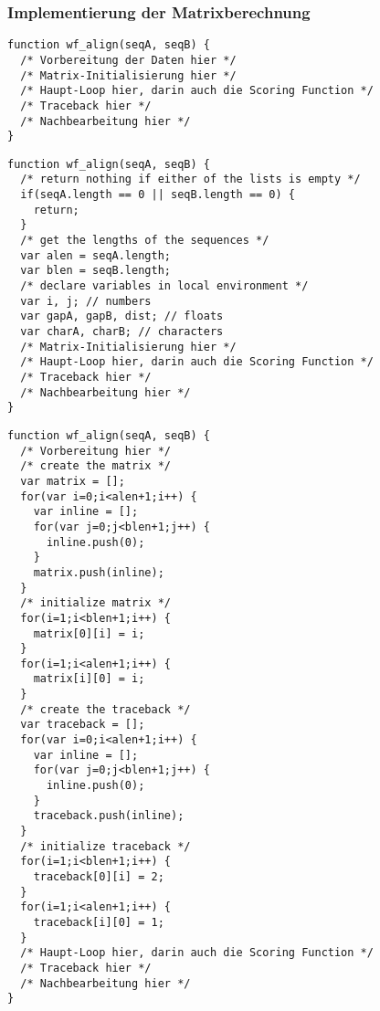 \subsubsection{\texorpdfstring{{Implementierung der
Matrixberechnung}}{Implementierung der Matrixberechnung}}

\begin{verbatim}
function wf_align(seqA, seqB) {
  /* Vorbereitung der Daten hier */
  /* Matrix-Initialisierung hier */
  /* Haupt-Loop hier, darin auch die Scoring Function */
  /* Traceback hier */
  /* Nachbearbeitung hier */
}
\end{verbatim}



\begin{verbatim}
function wf_align(seqA, seqB) {
  /* return nothing if either of the lists is empty */
  if(seqA.length == 0 || seqB.length == 0) {
    return;
  }
  /* get the lengths of the sequences */
  var alen = seqA.length;
  var blen = seqB.length;
  /* declare variables in local environment */
  var i, j; // numbers
  var gapA, gapB, dist; // floats
  var charA, charB; // characters
  /* Matrix-Initialisierung hier */
  /* Haupt-Loop hier, darin auch die Scoring Function */
  /* Traceback hier */
  /* Nachbearbeitung hier */
}
\end{verbatim}


\begin{verbatim}
function wf_align(seqA, seqB) {
  /* Vorbereitung hier */
  /* create the matrix */
  var matrix = [];
  for(var i=0;i<alen+1;i++) {
    var inline = [];
    for(var j=0;j<blen+1;j++) {
      inline.push(0);
    }
    matrix.push(inline);
  }
  /* initialize matrix */
  for(i=1;i<blen+1;i++) {
    matrix[0][i] = i;
  }
  for(i=1;i<alen+1;i++) {
    matrix[i][0] = i;
  }
  /* create the traceback */
  var traceback = [];
  for(var i=0;i<alen+1;i++) {
    var inline = [];
    for(var j=0;j<blen+1;j++) {
      inline.push(0);
    }
    traceback.push(inline);
  }
  /* initialize traceback */
  for(i=1;i<blen+1;i++) {
    traceback[0][i] = 2;
  }
  for(i=1;i<alen+1;i++) {
    traceback[i][0] = 1;
  }
  /* Haupt-Loop hier, darin auch die Scoring Function */
  /* Traceback hier */
  /* Nachbearbeitung hier */
}
\end{verbatim}



